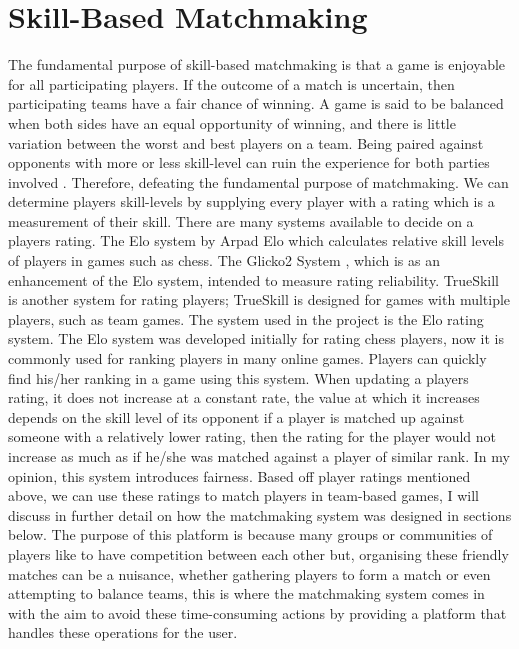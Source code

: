 \section{Skill-Based Matchmaking}
The fundamental purpose of skill-based matchmaking is that a game is enjoyable for all participating players. \cite{graepel2006ranking} If the outcome of a match is uncertain, then participating teams have a fair chance of winning. A game is said to be balanced when both sides have an equal opportunity of winning, and there is little variation between the worst and best players on a team. Being paired against opponents with more or less skill-level can ruin the experience for both parties involved \cite{alman2017theoretical}. Therefore, defeating the fundamental purpose of matchmaking. We can determine players skill-levels by supplying every player with a rating which is a measurement of their skill. There are many systems available to decide on a players rating. The Elo system by Arpad Elo which calculates relative skill levels of players in games such as chess. The Glicko2 System \cite{glickman2012example}, which is as an enhancement of the Elo system, intended to measure rating reliability. TrueSkill is another system for rating players; TrueSkill is designed for games with multiple players, such as team games.
The system used in the project is the Elo rating system. The Elo system \cite{pelanek2016applications} was developed initially for rating chess players, now it is commonly used for ranking players in many online games. Players can quickly find his/her ranking in a game using this system. When updating a players rating, it does not increase at a constant rate, the value at which it increases depends on the skill level of its opponent if a player is matched up against someone with a relatively lower rating, then the rating for the player would not increase as much as if he/she was matched against a player of similar rank. In my opinion, this system introduces fairness.\newline
Based off player ratings mentioned above, we can use these ratings to match players in team-based games, I will discuss in further detail on how the matchmaking system was designed in sections below.
The purpose of this platform is because many groups or communities of players like to have competition between each other but, organising these friendly matches can be a nuisance, whether gathering players to form a match or even attempting to balance teams, this is where the matchmaking system comes in with the aim to avoid these time-consuming actions by providing a platform that handles these operations for the user.
